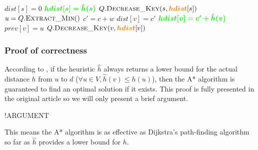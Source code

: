 \begin{center}
\begin{algorithm}[H]
\begin{minipage}[t]{0.49\linewidth}
\begin{algorithmic}[1]
                    \State $dist[s] = 0$
                    \State $\textcolor{green}{\bm{hdist[s] = \hat{h}(s)}}$
                    \State $Q.\Call{Decrease\_Key}{s, \textcolor{orange}{\bm{hdist}}[s]}$
                        \State $u = Q.\Call{Extract\_Min}{ }$
                            \State $c' = c + w$
                                \State $dist[v] = c'$
                                \State $\textcolor{green}{\bm{hdist[v] = c'+\hat{h}(v)}}$
                                \State $prev[v] = u$
                                \State $Q.\Call{Decrease\_Key}{v, \textcolor{orange}{\bm{hdist}}[v]}$
                            \EndIf
                        \EndFor
                    \EndWhile
                    \State {}
                \EndFunction
            \end{algorithmic}
        \end{minipage}
    \end{algorithm}
\end{center}
\subsubsection{Proof of correctness}
According to \cite{Astar}, if the heuristic $\hat{h}$ always returns a lower bound for the actual distance $h$ from $u$ to $d$ ($\forall u \in V, \hat{h}(v) \leq h(u)$), then the A* algorithm is guaranteed to find an optimal solution if it exists. This proof is fully presented in the original article so we will only present a brief argument.\par
!ARGUMENT\par
This means the A* algorithm is as effective as Dijkstra's path-finding algorithm so far as $\hat{h}$ provides a lower bound for $h$.
